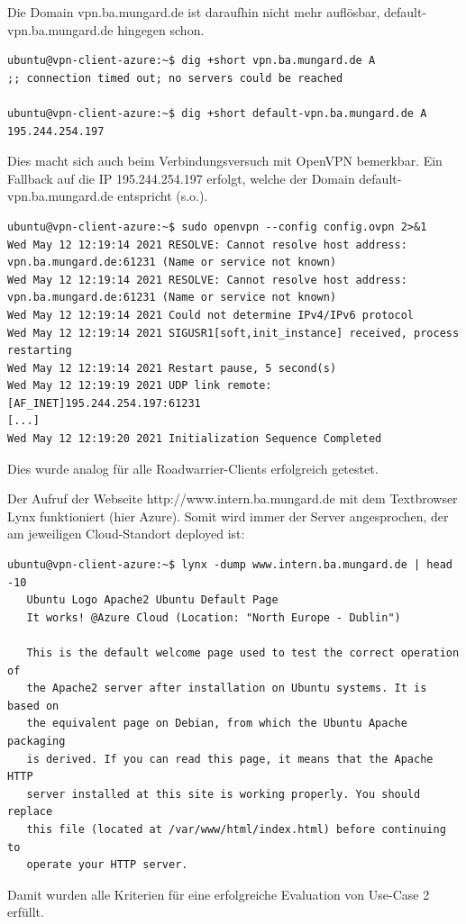 Die Domain vpn.ba.mungard.de ist daraufhin nicht mehr auflösbar, default-vpn.ba.mungard.de hingegen schon.

\begin{lstlisting}[label=connection-fail-to-vpn-fallback-to-default-vpn,caption=.]
ubuntu@vpn-client-azure:~$ dig +short vpn.ba.mungard.de A
;; connection timed out; no servers could be reached

ubuntu@vpn-client-azure:~$ dig +short default-vpn.ba.mungard.de A
195.244.254.197
\end{lstlisting}

Dies macht sich auch beim Verbindungsversuch mit OpenVPN bemerkbar. Ein Fallback auf die IP 195.244.254.197 erfolgt, welche der Domain default-vpn.ba.mungard.de entspricht (s.o.).
\begin{lstlisting}[label=connection-fail-vpn-fallback-to-default-vpn,caption=.]
ubuntu@vpn-client-azure:~$ sudo openvpn --config config.ovpn 2>&1
Wed May 12 12:19:14 2021 RESOLVE: Cannot resolve host address: vpn.ba.mungard.de:61231 (Name or service not known)
Wed May 12 12:19:14 2021 RESOLVE: Cannot resolve host address: vpn.ba.mungard.de:61231 (Name or service not known)
Wed May 12 12:19:14 2021 Could not determine IPv4/IPv6 protocol
Wed May 12 12:19:14 2021 SIGUSR1[soft,init_instance] received, process restarting
Wed May 12 12:19:14 2021 Restart pause, 5 second(s)
Wed May 12 12:19:19 2021 UDP link remote: [AF_INET]195.244.254.197:61231
[...]
Wed May 12 12:19:20 2021 Initialization Sequence Completed
\end{lstlisting}

Dies wurde analog für alle Roadwarrier-Clients erfolgreich getestet.

Der Aufruf der Webseite http://www.intern.ba.mungard.de mit dem Textbrowser Lynx funktioniert (hier Azure). Somit wird immer der Server angesprochen, der am jeweiligen Cloud-Standort deployed ist:
\begin{lstlisting}[label=lynx-default-page,caption=.]
ubuntu@vpn-client-azure:~$ lynx -dump www.intern.ba.mungard.de | head -10
   Ubuntu Logo Apache2 Ubuntu Default Page
   It works! @Azure Cloud (Location: "North Europe - Dublin")

   This is the default welcome page used to test the correct operation of
   the Apache2 server after installation on Ubuntu systems. It is based on
   the equivalent page on Debian, from which the Ubuntu Apache packaging
   is derived. If you can read this page, it means that the Apache HTTP
   server installed at this site is working properly. You should replace
   this file (located at /var/www/html/index.html) before continuing to
   operate your HTTP server.

\end{lstlisting}

Damit wurden alle Kriterien für eine erfolgreiche Evaluation von Use-Case 2 erfüllt.



